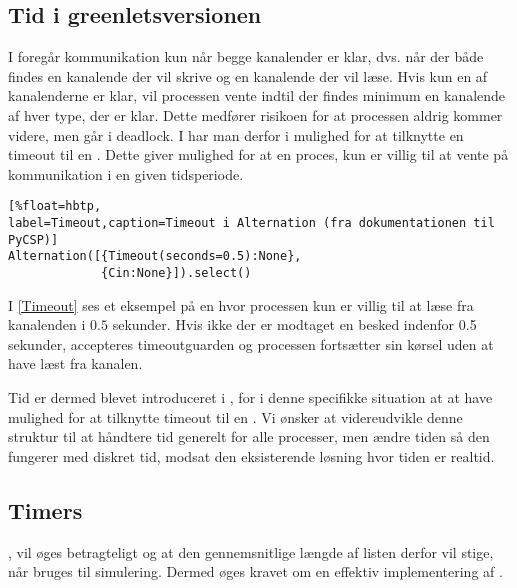 


\begin{shaded}
\subsection{Tid i greenletsversionen} 
I \pycsp foregår kommunikation
kun når begge kanalender er klar, dvs. når der både findes en
kanalende der vil skrive og en kanalende der vil læse. Hvis
kun en af kanalenderne er klar, vil processen vente indtil der findes
minimum en kanalende af hver type, der er klar. Dette medfører
risikoen for at processen aldrig kommer videre, men går i deadlock.
I \pycsp har man derfor i  mulighed for at
tilknytte en timeout til en . Dette giver mulighed for
at en proces, kun er villig til at vente på kommunikation i en
given tidsperiode. 
\begin{lstlisting}[%float=hbtp, 
label=Timeout,caption=Timeout i Alternation (fra dokumentationen til PyCSP)]
Alternation([{Timeout(seconds=0.5):None}, 
             {Cin:None}]).select()
\end{lstlisting}

I \cref{Timeout} ses et eksempel på en  hvor processen kun er villig
til at læse fra kanalenden  i $0.5$ sekunder. Hvis ikke der
er modtaget en besked indenfor 0.5 sekunder, accepteres timeoutguarden
og processen fortsætter sin kørsel uden at have læst fra kanalen.

Tid er dermed blevet introduceret i \pycsp, for i denne specifikke situation at at have
mulighed for at tilknytte timeout til en . Vi ønsker
at videreudvikle denne struktur til at håndtere tid generelt for alle
processer, men ændre tiden så den fungerer med diskret tid, modsat den eksisterende
løsning hvor tiden er realtid.
\end{shaded}

\subsection{Timers}  
, vil øges betragteligt og at den gennemsnitlige
længde af listen derfor vil stige, når \pycsp bruges til simulering. Dermed 
øges kravet om en effektiv implementering af . 

